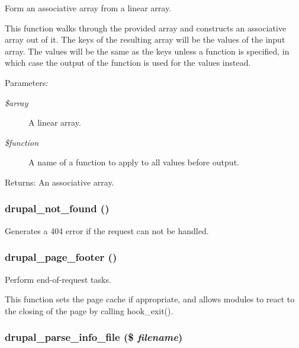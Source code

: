 Form an associative array from a linear array.

This function walks through the provided array and constructs an associative array out of it. The keys of the resulting array will be the values of the input array. The values will be the same as the keys unless a function is specified, in which case the output of the function is used for the values instead.

\begin{Desc}
\item[Parameters:]
\begin{description}
\item[{\em \$array}]A linear array. \item[{\em \$function}]A name of a function to apply to all values before output. \end{description}
\end{Desc}
\begin{Desc}
\item[Returns:]An associative array. \end{Desc}
\hypertarget{common_8inc_52b08cd98e1756326c1bd5b56c39a884}{
\subsubsection[{drupal\_\-not\_\-found}]{\setlength{\rightskip}{0pt plus 5cm}drupal\_\-not\_\-found ()}}
\label{common_8inc_52b08cd98e1756326c1bd5b56c39a884}


Generates a 404 error if the request can not be handled. \hypertarget{common_8inc_64bc7d539a74e850935d73968788abd3}{
\subsubsection[{drupal\_\-page\_\-footer}]{\setlength{\rightskip}{0pt plus 5cm}drupal\_\-page\_\-footer ()}}
\label{common_8inc_64bc7d539a74e850935d73968788abd3}


Perform end-of-request tasks.

This function sets the page cache if appropriate, and allows modules to react to the closing of the page by calling hook\_\-exit(). \hypertarget{common_8inc_277955232059631211fcfde533ea89d6}{
\subsubsection[{drupal\_\-parse\_\-info\_\-file}]{\setlength{\rightskip}{0pt plus 5cm}drupal\_\-parse\_\-info\_\-file (\$ {\em filename})}}
\label{common_8inc_277955232059631211fcfde533ea89d6}


